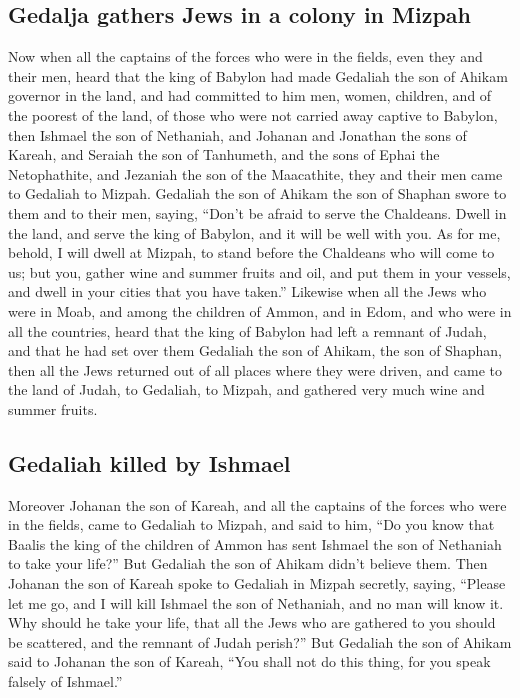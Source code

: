 \hypertarget{gedalja-gathers-jews-in-a-colony-in-mizpah}{%
\subsection{Gedalja gathers Jews in a colony in
Mizpah}\label{gedalja-gathers-jews-in-a-colony-in-mizpah}}

 Now when all the captains of the forces who were in the
fields, even they and their men, heard that the king of Babylon had made
Gedaliah the son of Ahikam governor in the land, and had committed to
him men, women, children, and of the poorest of the land, of those who
were not carried away captive to Babylon,  then Ishmael
the son of Nethaniah, and Johanan and Jonathan the sons of Kareah, and
Seraiah the son of Tanhumeth, and the sons of Ephai the Netophathite,
and Jezaniah the son of the Maacathite, they and their men came to
Gedaliah to Mizpah.  Gedaliah the son of Ahikam the son of
Shaphan swore to them and to their men, saying, ``Don't be afraid to
serve the Chaldeans. Dwell in the land, and serve the king of Babylon,
and it will be well with you.  As for me, behold, I will
dwell at Mizpah, to stand before the Chaldeans who will come to us; but
you, gather wine and summer fruits and oil, and put them in your
vessels, and dwell in your cities that you have taken.'' 
Likewise when all the Jews who were in Moab, and among the children of
Ammon, and in Edom, and who were in all the countries, heard that the
king of Babylon had left a remnant of Judah, and that he had set over
them Gedaliah the son of Ahikam, the son of Shaphan, 
then all the Jews returned out of all places where they were driven, and
came to the land of Judah, to Gedaliah, to Mizpah, and gathered very
much wine and summer fruits.

\hypertarget{gedaliah-killed-by-ishmael}{%
\subsection{Gedaliah killed by
Ishmael}\label{gedaliah-killed-by-ishmael}}

 Moreover Johanan the son of Kareah, and all the captains
of the forces who were in the fields, came to Gedaliah to Mizpah,
 and said to him, ``Do you know that Baalis the king of
the children of Ammon has sent Ishmael the son of Nethaniah to take your
life?'' But Gedaliah the son of Ahikam didn't believe them.
 Then Johanan the son of Kareah spoke to Gedaliah in
Mizpah secretly, saying, ``Please let me go, and I will kill Ishmael the
son of Nethaniah, and no man will know it. Why should he take your life,
that all the Jews who are gathered to you should be scattered, and the
remnant of Judah perish?''  But Gedaliah the son of
Ahikam said to Johanan the son of Kareah, ``You shall not do this thing,
for you speak falsely of Ishmael.''

